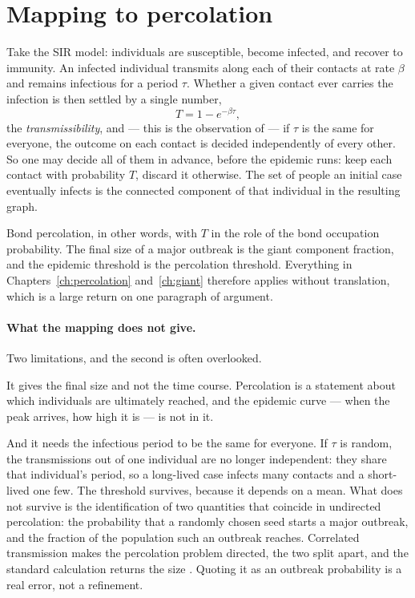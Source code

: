 \section{Mapping to percolation}
\label{sec:sirperc}

Take the SIR model: individuals are susceptible, become infected, and recover
to immunity. An infected individual transmits along each of their contacts at
rate $\beta$ and remains infectious for a period $\tau$. Whether a given
contact ever carries the infection is then settled by a single number,
\begin{equation}
  T=1-e^{-\beta\tau},
  \label{eq:transmissibility}
\end{equation}
the \emph{transmissibility}, and --- this is the observation of
\citet{newman2002} --- if $\tau$ is the same for everyone, the outcome on each
contact is decided independently of every other. So one may decide all of them
in advance, before the epidemic runs: keep each contact with probability $T$,
discard it otherwise. The set of people an initial case eventually infects is
the connected component of that individual in the resulting graph.

Bond percolation, in other words, with $T$ in the role of the bond occupation
probability. The final size of a major outbreak is the giant component
fraction, and the epidemic threshold is the percolation threshold. Everything
in Chapters~\ref{ch:percolation} and~\ref{ch:giant} therefore applies without
translation, which is a large return on one paragraph of argument.

\paragraph{What the mapping does not give.} Two limitations, and the second is
often overlooked.

It gives the final size and not the time course. Percolation is a statement
about which individuals are ultimately reached, and the epidemic curve --- when
the peak arrives, how high it is --- is not in it.

And it needs the infectious period to be the same for everyone. If $\tau$ is
random, the transmissions out of one individual are no longer independent: they
share that individual's period, so a long-lived case infects many contacts and
a short-lived one few. The threshold survives, because it depends on a mean.
What does not survive is the identification of two quantities that coincide in
undirected percolation: the probability that a randomly chosen seed starts a
major outbreak, and the fraction of the population such an outbreak reaches.
Correlated transmission makes the percolation problem directed, the two split
apart, and the standard calculation returns the size
\citep{kenah2007,miller2007}. Quoting it as an outbreak probability is a real
error, not a refinement.

